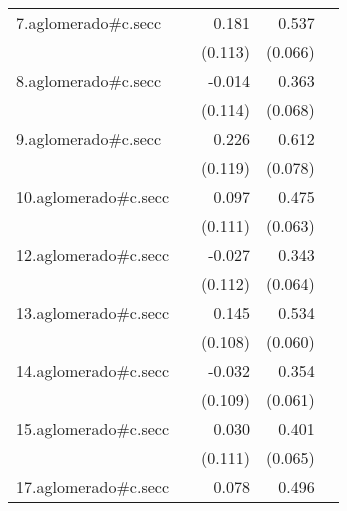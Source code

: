 {\begin{longtable}{l*{4}{D{.}{.}{-1}}}
\addlinespace
7.aglomerado#c.secc&                     &       0.181         &       0.537\sym{***}&                     \\
            &                     &     (0.113)         &     (0.066)         &                     \\
\addlinespace
8.aglomerado#c.secc&                     &      -0.014         &       0.363\sym{***}&                     \\
            &                     &     (0.114)         &     (0.068)         &                     \\
\addlinespace
9.aglomerado#c.secc&                     &       0.226         &       0.612\sym{***}&                     \\
            &                     &     (0.119)         &     (0.078)         &                     \\
\addlinespace
10.aglomerado#c.secc&                     &       0.097         &       0.475\sym{***}&                     \\
            &                     &     (0.111)         &     (0.063)         &                     \\
\addlinespace
12.aglomerado#c.secc&                     &      -0.027         &       0.343\sym{***}&                     \\
            &                     &     (0.112)         &     (0.064)         &                     \\
\addlinespace
13.aglomerado#c.secc&                     &       0.145         &       0.534\sym{***}&                     \\
            &                     &     (0.108)         &     (0.060)         &                     \\
\addlinespace
14.aglomerado#c.secc&                     &      -0.032         &       0.354\sym{***}&                     \\
            &                     &     (0.109)         &     (0.061)         &                     \\
\addlinespace
15.aglomerado#c.secc&                     &       0.030         &       0.401\sym{***}&                     \\
            &                     &     (0.111)         &     (0.065)         &                     \\
\addlinespace
17.aglomerado#c.secc&                     &       0.078         &       0.496\sym{***}&                     \\

\end{longtable}}
